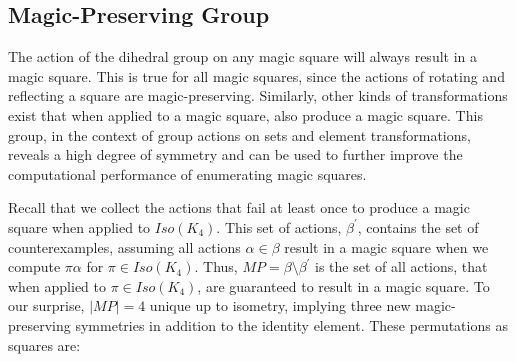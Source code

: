 \documentclass{rhumj_new}
\begin{document}
\subsection{Magic-Preserving Group}

The action of the dihedral group on any magic square will always result in a magic square. This is
true for all magic squares, since the actions of rotating and reflecting a square are
magic-preserving. Similarly, other kinds of transformations exist that when applied to a magic
square, also produce a magic square. This group, in the context of group actions on sets and
element transformations, reveals a high degree of symmetry and can be used to further improve the
computational performance of enumerating magic squares.

Recall that we collect the actions that fail at least once to produce a magic square when applied
to $Iso(K_4)$. This set of actions, ${\beta}^\prime$, contains the set of counterexamples, assuming
all actions $\alpha\in\beta$ result in a magic square when we compute $\pi\alpha$ for $\pi\in
  Iso(K_4)$. Thus, $MP=\beta\setminus{\beta}^\prime$ is the set of all actions, that when applied
to
$\pi\in Iso(K_4)$, are guaranteed to result in a magic square. To our surprise, $\left|MP\right|=4$
unique up to isometry, implying three new magic-preserving symmetries in addition to the identity
element. These permutations as squares are:
\end{document}
